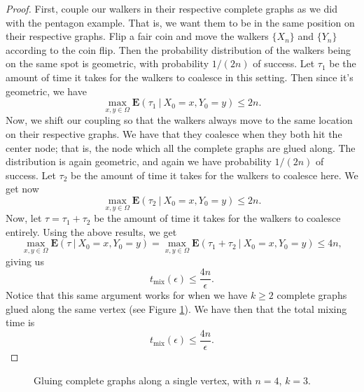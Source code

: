 \documentclass[10pt,a4paper]{amsart}
\theoremstyle{definition}
\numberwithin{definition}{section}
\begin{document}
\begin{proof}
First, couple our walkers in their respective complete graphs as we did with the pentagon example. That is, we want them to be in the same position on their respective graphs. Flip a fair coin and move the walkers $\{X_n\}$ and $\{Y_n\}$ according to the coin flip. Then the probability distribution of the walkers being on the same spot is geometric, with probability $1/(2n)$ of success. Let $\tau_1$ be the amount of time it takes for the walkers to coalesce in this setting. Then since it's geometric, we have 
\[ \max_{x,y \in \Omega} \mathbf{E}(\tau_1 \ | \ X_0 = x, Y_0 = y) \leq 2n.\]
Now, we shift our coupling so that the walkers always move to the same location on their respective graphs. We have that they coalesce when they both hit the center node; that is, the node which all the complete graphs are glued along. The distribution is again geometric, and again we have probability $1/(2n)$ of success. Let $\tau_2$ be the amount of time it takes for the walkers to coalesce here. We get now 
\[ \max_{x, y \in \Omega} \mathbf{E}(\tau_2 \ | \ X_0 =x, Y_0 =y) \leq 2n.\]
Now, let $\tau = \tau_1 + \tau_2$ be the amount of time it takes for the walkers to coalesce entirely. Using the above results, we get 
\[ \max_{x, y \in \Omega} \mathbf{E}(\tau \ | \ X_0 =x, Y_0 =y) = \max_{x,y \in \Omega} \mathbf{E}(\tau_1 + \tau_2 \ | \ X_0 = x, Y_0 = y) \leq 4n, \]
giving us
\[ t_{\text{mix}}(\epsilon) \leq \frac{4n}{\epsilon}.\]
Notice that this same argument works for when we have $k \geq 2$ complete graphs glued along the same vertex (see Figure \ref{fig:graph16}). We have then that the total mixing time is 
\[t_{\text{mix}}(\epsilon) \leq \frac{4n}{\epsilon}. \]
\end{proof}


\begin{figure}

\begin{center}
\end{center}
\caption{Gluing complete graphs along a single vertex, with $n=4$, $k=3$.}
\label{fig:graph16}
\end{figure}
\end{document}
